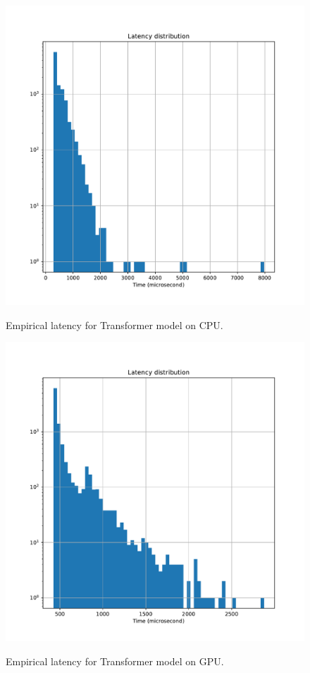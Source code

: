 \documentclass[a4paper, twoside]{report}
\theoremstyle{definition}
\numberwithin{equation}{section}
\begin{document}
\begin{figure}[h!]
    \centering
    \caption{Empirical latency for Transformer model on CPU.}
    \includegraphics[width=\textwidth]{etc/transformer_cpu_latency.pdf}
    \label{fig:transformer_cpu_latency}
\end{figure}

\begin{figure}[h!]
    \centering
    \caption{Empirical latency for Transformer model on GPU.}
    \includegraphics[width=\textwidth]{etc/transformer_gpu_latency.pdf}
    \label{fig:transformer_gpu_latency}
\end{figure}
\end{document}
